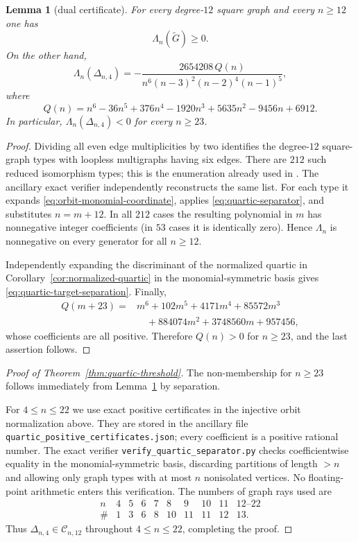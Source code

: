 \documentclass[11pt]{amsart}
\numberwithin{equation}{section}
\newtheorem{lemma}[theorem]{Lemma}
\begin{document}
\begin{lemma}[dual certificate]\label{lem:quartic-dual}
For every degree-$12$ square graph and every $n\ge12$ one has
\[
                   \Lambda_n(\widetilde G)\ge0.
\]
On the other hand,
\begin{equation}\label{eq:quartic-target-separation}
 \Lambda_n(\Delta_{n,4})=
 -\frac{2654208\,Q(n)}
 {n^6(n-3)^2(n-2)^4(n-1)^5},
\end{equation}
where
\[
 Q(n)=n^6-36n^5+376n^4-1920n^3+5635n^2-9456n+6912.
\]
In particular, $\Lambda_n(\Delta_{n,4})<0$ for every $n\ge23$.
\end{lemma}

\begin{proof}
Dividing all even edge multiplicities by two identifies the degree-$12$
square-graph types with loopless multigraphs having six edges.  There are
$212$ such reduced isomorphism types; this is the enumeration already used in
\cite{AS}.  The ancillary exact verifier independently reconstructs the same
list.  For each type it expands \eqref{eq:orbit-monomial-coordinate}, applies
\eqref{eq:quartic-separator}, and substitutes $n=m+12$.  In all $212$ cases
the resulting polynomial in $m$ has nonnegative integer coefficients (in
$53$ cases it is identically zero).  Hence $\Lambda_n$ is nonnegative on every
generator for all $n\ge12$.

Independently expanding the discriminant of the normalized quartic in
Corollary~\ref{cor:normalized-quartic} in the monomial-symmetric basis gives
\eqref{eq:quartic-target-separation}.  Finally,
\[
\begin{aligned}
Q(m+23)={}&m^6+102m^5+4171m^4+85572m^3\\
          &\quad+884074m^2+3748560m+957456,
\end{aligned}
\]
whose coefficients are all positive.  Therefore $Q(n)>0$ for $n\ge23$, and
the last assertion follows.
\end{proof}

\begin{proof}[Proof of Theorem~\ref{thm:quartic-threshold}]
The non-membership for $n\ge23$ follows immediately from
Lemma~\ref{lem:quartic-dual} by separation.

For $4\le n\le22$ we use exact positive certificates in the injective orbit
normalization above.  They are stored in the ancillary file
\texttt{quartic\_positive\_certificates.json}; every coefficient is a positive
rational number.  The exact verifier \texttt{verify\_quartic\_separator.py}
checks coefficientwise equality in the monomial-symmetric basis, discarding
partitions of length $>n$ and allowing only graph types with at most $n$
nonisolated vertices.  No floating-point arithmetic enters this verification.
The numbers of graph rays used are
\[
\begin{array}{c|ccccccccc}
 n&4&5&6&7&8&9&10&11&12\text{--}22\\ \hline
 \#&1&3&6&8&10&11&11&12&13.
\end{array}
\]
Thus $\Delta_{n,4}\in\mathcal C_{n,12}$ throughout $4\le n\le22$, completing
the proof.
\end{proof}
\end{document}
